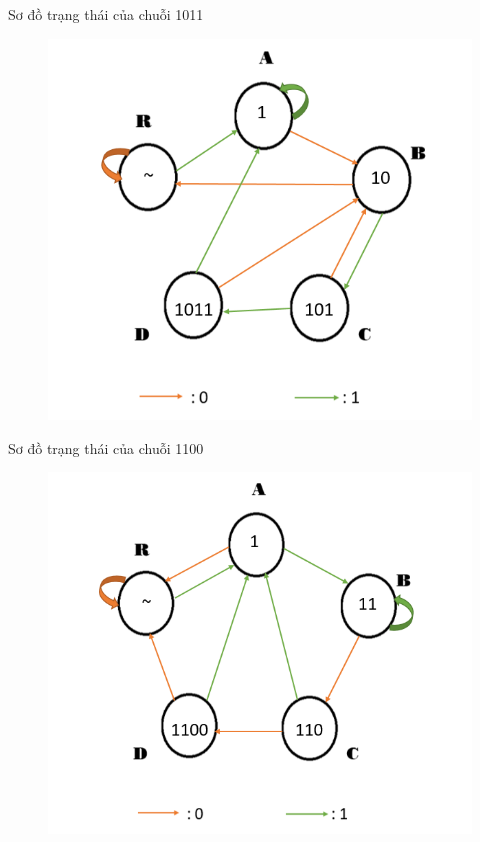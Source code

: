 \documentclass[a4paper]{article}
\begin{document}
		Sơ đồ trạng thái của chuỗi 1011
	\begin{center}
	\begin{figure}[h]
		\begin{center}
			\includegraphics[scale=0.53]{1011.png}
		\end{center}
	\end{figure}
	\end{center}
	\newpage
	Sơ đồ trạng thái của chuỗi 1100
	\begin{center}
	\begin{figure}[h]
		\begin{center}
			\includegraphics[scale=0.53]{1100.png}
		\end{center}
	\end{figure}
	\end{center}
	
\end{document}
